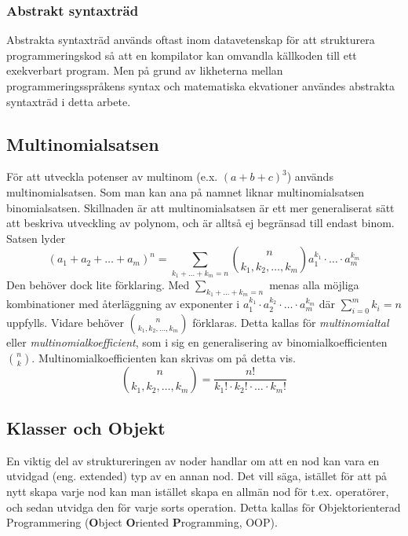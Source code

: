 \documentclass[12pt,a4paper]{article}
\begin{document}
\subsubsection{Abstrakt syntaxträd}
Abstrakta syntaxträd används oftast inom datavetenskap för att strukturera programmeringskod så att en kompilator kan omvandla källkoden till ett exekverbart program. Men på grund av likheterna mellan programmeringsspråkens syntax och matematiska ekvationer användes abstrakta syntaxträd i detta arbete.
\subsection{Multinomialsatsen}
För att utveckla potenser av multinom (e.x. \((a + b + c)^{3}\)) används multinomialsatsen. Som man kan ana på namnet liknar multinomialsatsen binomialsatsen. Skillnaden är att multinomialsatsen är ett mer generaliserat sätt att beskriva utveckling av polynom, och är alltså ej begränsad till endast binom. Satsen lyder
\[(a_{1}+a_{2}+\ldots+a_{m})^{n}=\displaystyle\sum_{k_{1}+\dots+k_{m}=n}\binom{n}{k_{1},k_{2},\dots,k_{m}}a_{1}^{k_{1}}\cdot\ldots\cdot a_{m}^{k_{m}}\]
Den behöver dock lite förklaring. Med \(\displaystyle\sum_{k_{1}+\dots+k_{m}=n}\) menas alla möjliga kombinationer med återläggning av exponenter i \(a_{1}^{k_{1}}\cdot a_{2}^{k_{2}}\cdot\ldots\cdot a_{m}^{k_{m}}\) där \(\displaystyle\sum_{i=0}^{m}k_{i}=n\) uppfylls. Vidare behöver  \(\binom{n}{k_{1},k_{2},\ldots,k_{m}}\) förklaras. Detta kallas för \textit{multinomialtal} eller \textit{multinomialkoefficient}, som i sig en generalisering av binomialkoefficienten \(\binom{n}{k}\). Multinomialkoefficienten kan skrivas om på detta vis.
\[\binom{n}{k_{1},k_{2},\ldots,k_{m}}=\frac{n!}{k_{1}!\cdot k_{2}!\cdot\ldots\cdot k_{m}!}\]

\subsection{Klasser och Objekt}
\label{subsection:klasserochobjekt}
En viktig del av struktureringen av noder handlar om att en nod kan vara en utvidgad (eng. extended) typ av en annan nod. Det vill säga, istället för att på nytt skapa varje nod kan man istället skapa en allmän nod för t.ex. operatörer, och sedan utvidga den för varje sorts operation. Detta kallas för Objektorienterad Programmering (\textbf{O}bject \textbf{O}riented \textbf{P}rogramming, OOP). 
\end{document}

